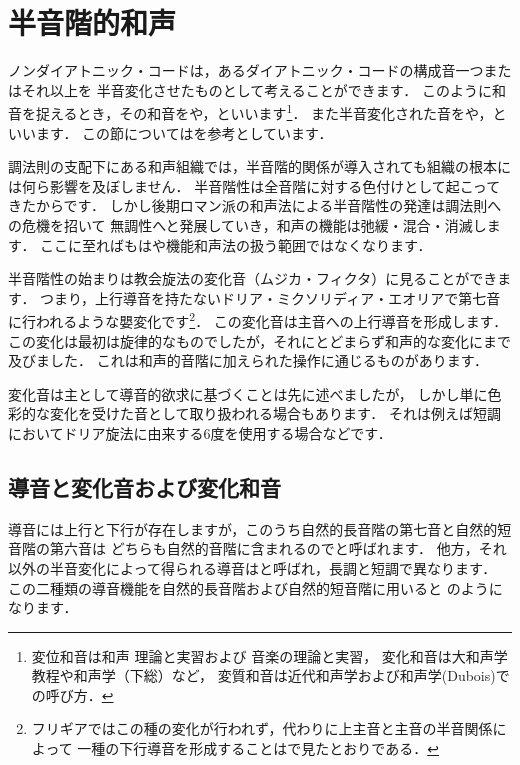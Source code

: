 \documentclass[dvipdfmx,uplatex,b5paper,openany,jbase=12Q,nomag*,textwidth-limit=44%
               ]{gachimuchi}
\begin{document}
\section{半音階的和声}%
ノンダイアトニック・コードは，あるダイアトニック・コードの構成音一つまたはそれ以上を
半音変化させたものとして考えることができます．
このように和音を捉えるとき，その和音をや，といいます\footnote{%
  変位和音は和声 理論と実習\cite{chSHIMAOKA1i,chSHIMAOKA1ii,chSHIMAOKA1iii}および
            音楽の理論と実習\cite{ctSHIMAOKA1i,ctSHIMAOKA1ii,ctSHIMAOKA1iii}，
  変化和音は大和声学教程\cite{chHASEGAWA1}や和声学（下総）\cite{chSHIMOFUSA1}など，
  変質和音は近代和声学\cite{chMATSUDAIRA1}および和声学(Dubois)\cite{chDUBOIS1}での呼び方．
}．
また半音変化された音をや，といいます．
この節についてはを参考としています．

\begin{Yodan}
調法則の支配下にある和声組織では，半音階的関係が導入されても組織の根本には何ら影響を及ぼしません．
半音階性は全音階に対する色付けとして起こってきたからです．
しかし後期ロマン派の和声法による半音階性の発達は調法則への危機を招いて
無調性へと発展していき，和声の機能は弛緩・混合・消滅します．
ここに至ればもはや機能和声法の扱う範囲ではなくなります．

半音階性の始まりは教会旋法の変化音（ムジカ・フィクタ）に見ることができます．
つまり，上行導音を持たないドリア・ミクソリディア・エオリアで第七音に行われるような嬰変化です\footnote{%
  フリギアではこの種の変化が行われず，代わりに上主音と主音の半音関係によって
  一種の下行導音を形成することはで見たとおりである．
}．
この変化音は主音への上行導音を形成します．
この変化は最初は旋律的なものでしたが，それにとどまらず和声的な変化にまで及びました．
これは和声的音階に加えられた操作に通じるものがあります．

変化音は主として導音的欲求に基づくことは先に述べましたが，
しかし単に色彩的な変化を受けた音として取り扱われる場合もあります．
それは例えば短調においてドリア旋法に由来する\bNatural6度を使用する場合などです．
\end{Yodan}

\subsection{導音と変化音および変化和音}
導音には上行と下行が存在しますが，このうち自然的長音階の第七音と自然的短音階の第六音は
どちらも自然的音階に含まれるのでと呼ばれます．
他方，それ以外の半音変化によって得られる導音はと呼ばれ，長調と短調で異なります．
この二種類の導音機能を自然的長音階および自然的短音階に用いると
のようになります．
\end{document}
